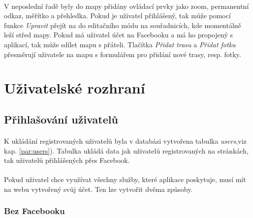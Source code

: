 \documentclass[11pt,a4paper,titlepage,oneside]{book}
\begin{document}

			\paragraph{} V neposlední řadě byly do mapy přidány ovládací prvky jako zoom, permanentní odkaz, měřítko a přehledka. Pokud je uživatel přihlášený, tak může pomocí funkce \textit{Upravit} přejít na do editačního módu na souřadnicích, kde momentálně leží střed mapy. Pokud má uživatel účet na Facebooku a má ho propojený s aplikací, tak může sdílet mapu s přáteli. Tlačítka \textit{Přidat trasu} a \textit{Přidat fotku} přesměrují uživatele na mapu s formulářem pro přidání nové trasy, resp. fotky.
			
		\section{Uživatelské rozhraní}
			\subsection{Přihlašování uživatelů}


				\paragraph{}K ukládání registrovaných uživatelů byla v databázi vytvořena tabulka \textit{users},viz kap. \ref{par:users}). Tabulka ukládá data jak uživatelů registrovaných na stránkách, tak uživatelů přihlášených přes Facebook.
					\paragraph{} Pokud uživatel chce využívat všechny služby, které aplikace poskytuje, musí mít na webu vytvořený svůj účet. Ten lze vytvořit dvěma způsoby.
					\subsubsection{Bez Facebooku} 
\end{document}
